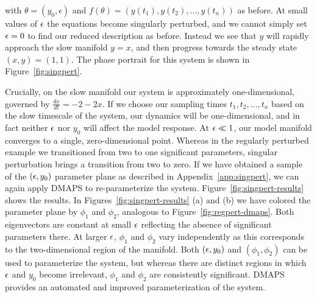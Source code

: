with $\theta = (y_0, \epsilon)$ and
$f(\theta) = \left(y(t_1), y(t_2), \dots, y(t_n) \right)$ as
before. At small values of $\epsilon$ the equations become singularly
perturbed, and we cannot simply set $\epsilon = 0$ to find our reduced
description as before. Instead we see that $y$ will rapidly approach
the slow manifold $y = x$, and then progress towards the steady state
$(x,y) = (1,1)$. The phase portrait for this system is shown in
Figure~\ref{fig:singpert}. 

Crucially, on the slow manifold our system is approximately
one-dimensional, governed by $\frac{dx}{dt} = -2 - 2x$. If we choose
our sampling times $t_1, t_2, \dots, t_n$ based on the slow timescale
of the system, our dynamics will be one-dimensional, and in fact
neither $\epsilon$ nor $y_0$ will affect the model response. At
$\epsilon \ll 1$, our model manifold converges to a single,
zero-dimensional point. Whereas in the regularly perturbed example we
transitioned from two to one significant parameters, singular
perturbation brings a transition from two to zero. If we have obtained
a sample of the $(\epsilon, y_0)$ parameter plane as described in
Appendix~\ref{app:singpert}, we can again apply DMAPS to
re-parameterize the system. Figure~\ref{fig:singpert-results} shows
the results. In Figures~\ref{fig:singpert-results} (a) and (b) we have
colored the parameter plane by $\phi_1$ and $\phi_2$, analogous to
Figure~\ref{fig:regpert-dmaps}. Both eigenvectors are constant at
small $\epsilon$ reflecting the absence of significant parameters
there. At larger $\epsilon$, $\phi_1$ and $\phi_2$ vary independently as
this corresponds to the two-dimensional region of the manifold. Both
$(\epsilon, y_0)$ and $(\phi_1, \phi_2)$ can be used to parameterize the
system, but whereas there are distinct regions in which $\epsilon$ and
$y_0$ become irrelevant, $\phi_1$ and $\phi_2$ are consistently
significant. DMAPS provides an automated and improved parameterization
of the system.


